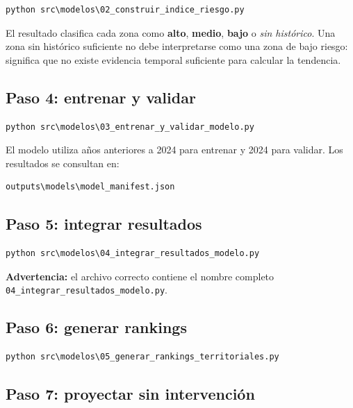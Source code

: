 \documentclass[11pt,a4paper]{article}
\newcommand{\alto}{\textcolor{riskred}{\textbf{alto}}}
\newcommand{\medio}{\textcolor{riskamber}{\textbf{medio}}}
\newcommand{\bajo}{\textcolor{riskgreen}{\textbf{bajo}}}
\begin{document}
\begin{lstlisting}[style=terminal]
python src\modelos\02_construir_indice_riesgo.py
\end{lstlisting}

El resultado clasifica cada zona como \alto{}, \medio{}, \bajo{} o \textit{sin histórico}. Una zona sin histórico suficiente no debe interpretarse como una zona de bajo riesgo: significa que no existe evidencia temporal suficiente para calcular la tendencia.

\subsection{Paso 4: entrenar y validar}

\begin{lstlisting}[style=terminal]
python src\modelos\03_entrenar_y_validar_modelo.py
\end{lstlisting}

El modelo utiliza años anteriores a 2024 para entrenar y 2024 para validar. Los resultados se consultan en:

\begin{lstlisting}[style=terminal]
outputs\models\model_manifest.json
\end{lstlisting}

\subsection{Paso 5: integrar resultados}

\begin{lstlisting}[style=terminal]
python src\modelos\04_integrar_resultados_modelo.py
\end{lstlisting}

\textbf{Advertencia:} el archivo correcto contiene el nombre completo \texttt{04\_integrar\_resultados\_modelo.py}.

\subsection{Paso 6: generar rankings}

\begin{lstlisting}[style=terminal]
python src\modelos\05_generar_rankings_territoriales.py
\end{lstlisting}

\subsection{Paso 7: proyectar sin intervención}
\end{document}
